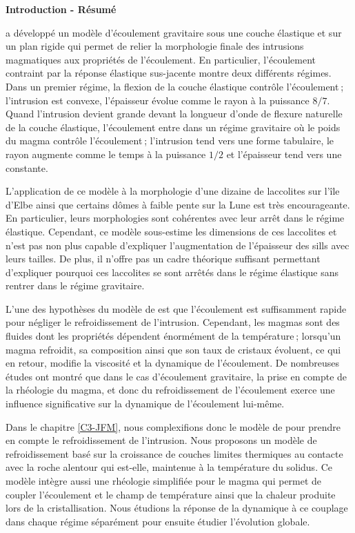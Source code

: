 \thispagestyle{plain}
\begin{flushleft}
 \Large \vspace{.5cm} \textbf{Introduction - Résumé}
\end{flushleft}
\citet{Michaut:2011kg} a développé un modèle d’écoulement gravitaire
sous une couche élastique et sur un plan rigide qui permet de relier
la morphologie finale des intrusions magmatiques aux propriétés de
l’écoulement. En particulier, l’écoulement contraint par la réponse
élastique sus-jacente montre deux différents régimes. Dans un premier
régime, la flexion de la couche élastique contrôle l’écoulement ;
l’intrusion est convexe, l’épaisseur évolue comme le rayon à la
puissance $8/7$. Quand l’intrusion devient grande devant la longueur
d’onde de flexure naturelle de la couche élastique, l’écoulement entre
dans un régime gravitaire où le poids du magma contrôle l’écoulement ; l’intrusion tend vers une forme tabulaire, le rayon augmente comme le
temps à la puissance $1/2$ et l’épaisseur tend vers une constante.

L’application de ce modèle à la morphologie d’une dizaine de
laccolites sur l’île d’Elbe ainsi que certains dômes à faible pente
sur la Lune est très encourageante. En particulier, leurs morphologies
sont cohérentes avec leur arrêt dans le régime élastique. Cependant, ce
modèle sous-estime les dimensions de ces laccolites et n’est pas non
plus capable d’expliquer l’augmentation de l’épaisseur des sills avec
leurs tailles. De plus, il n’offre pas un cadre théorique suffisant
permettant d’expliquer pourquoi ces laccolites se sont arrêtés dans le
régime élastique sans rentrer dans le régime gravitaire.

L’une des hypothèses du modèle de \citet{Michaut:2011kg} est que
l’écoulement est suffisamment rapide pour négliger le refroidissement
de l’intrusion. Cependant, les magmas sont des fluides dont les
propriétés dépendent énormément de la température ; lorsqu’un magma
refroidit, sa composition ainsi que son taux de cristaux évoluent, ce
qui en retour, modifie la viscosité et la dynamique de l’écoulement.
De nombreuses études ont montré que dans le cas d’écoulement
gravitaire, la prise en compte de la rhéologie du magma, et donc du
refroidissement de l’écoulement exerce une influence
significative sur la dynamique de l’écoulement lui-même.

Dans le chapitre \ref{C3-JFM}, nous complexifions donc le modèle de
\citet{Michaut:2011kg} pour prendre en compte le refroidissement de
l’intrusion. Nous proposons un modèle de refroidissement basé sur la
croissance de couches limites thermiques au contacte avec la roche
alentour qui est-elle, maintenue à la température du solidus. Ce
modèle intègre aussi une rhéologie simplifiée pour le magma qui permet
de coupler l’écoulement et le champ de température ainsi que la
chaleur produite lors de la cristallisation. Nous étudions la réponse
de la dynamique à ce couplage dans chaque régime séparément pour
ensuite étudier l’évolution globale.

